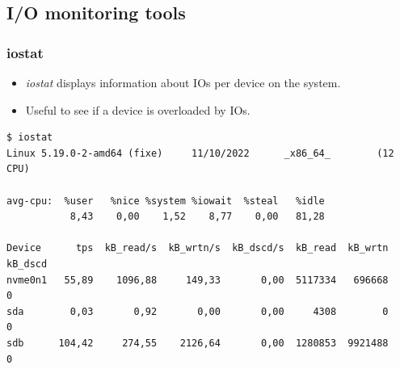\subsection{I/O monitoring tools}

\begin{frame}[fragile]
  \frametitle{iostat}
  \begin{itemize}
    \item {\em iostat} displays information about IOs per device on the system.
    \item Useful to see if a device is overloaded by IOs.
  \end{itemize}
  \begin{block}{}
    \begin{verbatim}
$ iostat 
Linux 5.19.0-2-amd64 (fixe)     11/10/2022      _x86_64_        (12 CPU)

avg-cpu:  %user   %nice %system %iowait  %steal   %idle
           8,43    0,00    1,52    8,77    0,00   81,28

Device      tps  kB_read/s  kB_wrtn/s  kB_dscd/s  kB_read  kB_wrtn  kB_dscd
nvme0n1   55,89    1096,88     149,33       0,00  5117334   696668        0
sda        0,03       0,92       0,00       0,00     4308        0        0
sdb      104,42     274,55    2126,64       0,00  1280853  9921488        0
    \end{verbatim}
  \end{block}
\end{frame}


